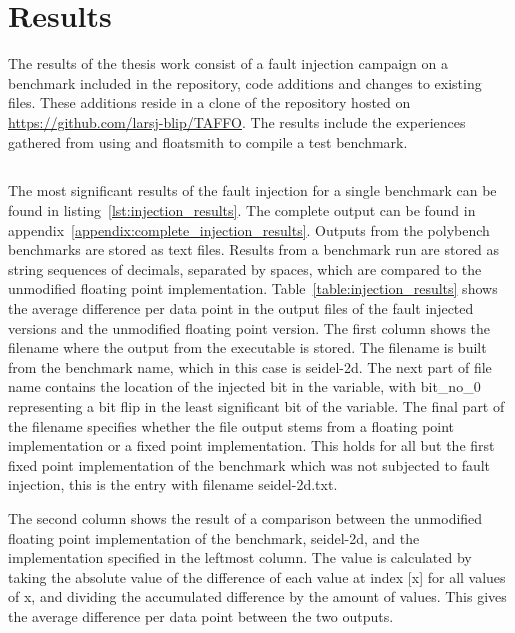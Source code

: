\section{Results}

The results of the thesis work consist of a fault injection campaign on a benchmark included in the \taffo{} repository, code additions and changes to existing files. These additions reside in a clone of the \taffo{} repository hosted on \href{https://github.com/larsj-blip/TAFFO}{https://github.com/larsj-blip/TAFFO}. The results include the experiences gathered from using \taffo{} and floatsmith to compile a test benchmark.


\subsection{\Taffo{}}
The most significant results of the fault injection for a single benchmark can be found in listing~\ref{lst:injection_results}. The complete output can be found in appendix~\ref{appendix:complete_injection_results}. Outputs from the polybench benchmarks are stored as text files. Results from a benchmark run are stored as string sequences of decimals, separated by spaces, which are compared to the unmodified floating point implementation. Table~\ref{table:injection_results} shows the average difference per data point in the output files of the fault injected versions and the unmodified floating point version.   
The first column shows the filename where the output from the executable is stored. The filename is built from the benchmark name, which in this case is seidel-2d. The next part of file name contains the location of the injected bit in the variable, with bit\_no\_0 representing a bit flip in the least significant bit of the variable. The final part of the filename specifies whether the file output stems from a floating point implementation or a fixed point implementation.  This holds for all but the first fixed point implementation of the benchmark which was not subjected to fault injection, this is the entry with filename seidel-2d.txt.

The second column shows the result of a comparison between the unmodified floating point implementation of the benchmark, seidel-2d, and the implementation specified in the leftmost column. The value is calculated by taking the absolute value of the difference of each value at index [x] for all values of x, and dividing the accumulated difference by the amount of values. This gives the average difference per data point between the two outputs.

